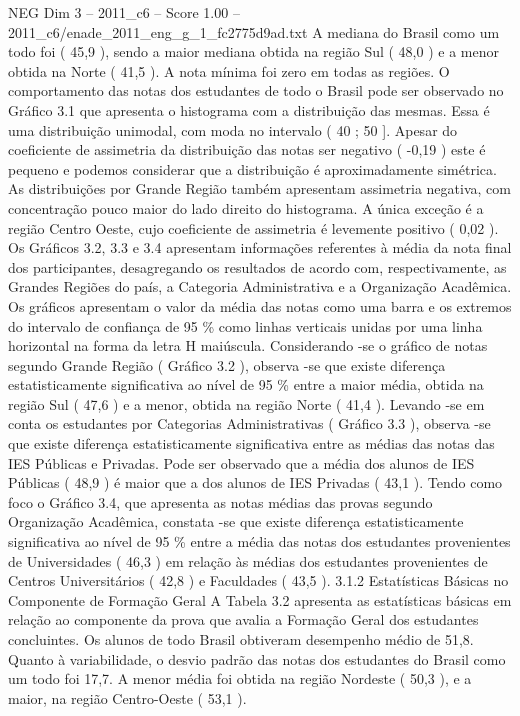 \begin{textsample}{NEG Dim 3 – 2011\_c6 – Score 1.00 – 2011\_c6/enade\_2011\_eng\_g\_1\_fc2775d9ad.txt}
A mediana do Brasil como um todo foi ( 45,9 ), sendo a maior mediana obtida na região Sul ( 48,0 ) e a menor obtida na Norte ( 41,5 ).
A nota mínima foi zero em todas as regiões.
O comportamento das notas dos estudantes de todo o Brasil pode ser observado no Gráfico 3.1 que apresenta o histograma com a distribuição das mesmas.
Essa é uma distribuição unimodal, com moda no intervalo ( 40 ; 50 ].
Apesar do coeficiente de assimetria da distribuição das notas ser negativo ( -0,19 ) este é pequeno e podemos considerar que a distribuição é aproximadamente simétrica.
As distribuições por Grande Região também apresentam assimetria negativa, com concentração pouco maior do lado direito do histograma.
A única exceção é a região Centro Oeste, cujo coeficiente de assimetria é levemente positivo ( 0,02 ).
Os Gráficos 3.2, 3.3 e 3.4 apresentam informações referentes à média da nota final dos participantes, desagregando os resultados de acordo com, respectivamente, as Grandes Regiões do país, a Categoria Administrativa e a Organização Acadêmica.
Os gráficos apresentam o valor da média das notas como uma barra e os extremos do intervalo de confiança de 95 \% como linhas verticais unidas por uma linha horizontal na forma da letra H maiúscula.
Considerando -se o gráfico de notas segundo Grande Região ( Gráfico 3.2 ), observa -se que existe diferença estatisticamente significativa ao nível de 95 \% entre a maior média, obtida na região Sul ( 47,6 ) e a menor, obtida na região Norte ( 41,4 ).
Levando -se em conta os estudantes por Categorias Administrativas ( Gráfico 3.3 ), observa -se que existe diferença estatisticamente significativa entre as médias das notas das IES Públicas e Privadas.
Pode ser observado que a média dos alunos de IES Públicas ( 48,9 ) é maior que a dos alunos de IES Privadas ( 43,1 ).
Tendo como foco o Gráfico 3.4, que apresenta as notas médias das provas segundo Organização Acadêmica, constata -se que existe diferença estatisticamente significativa ao nível de 95 \% entre a média das notas dos estudantes provenientes de Universidades ( 46,3 ) em relação às médias dos estudantes provenientes de Centros Universitários ( 42,8 ) e Faculdades ( 43,5 ). 3.1.2 Estatísticas Básicas no Componente de Formação Geral A Tabela 3.2 apresenta as estatísticas básicas em relação ao componente da prova que avalia a Formação Geral dos estudantes concluintes.
Os alunos de todo Brasil obtiveram desempenho médio de 51,8.
Quanto à variabilidade, o desvio padrão das notas dos estudantes do Brasil como um todo foi 17,7.
A menor média foi obtida na região Nordeste ( 50,3 ), e a maior, na região Centro-Oeste ( 53,1 ).

\end{textsample}
